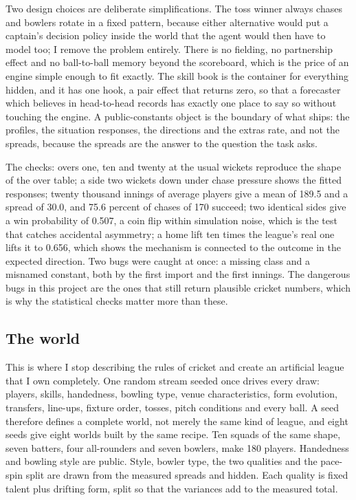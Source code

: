 \documentclass[11pt,letterpaper]{article}
\begin{document}
Two design choices are deliberate simplifications. The toss winner always chases and bowlers rotate in a fixed pattern, because either alternative would put a captain's decision policy inside the world that the agent would then have to model too; I remove the problem entirely. There is no fielding, no partnership effect and no ball-to-ball memory beyond the scoreboard, which is the price of an engine simple enough to fit exactly. The skill book is the container for everything hidden, and it has one hook, a pair effect that returns zero, so that a forecaster which believes in head-to-head records has exactly one place to say so without touching the engine. A public-constants object is the boundary of what ships: the profiles, the situation responses, the directions and the extras rate, and not the spreads, because the spreads are the answer to the question the task asks.


The checks: overs one, ten and twenty at the usual wickets reproduce the shape of the over table; a side two wickets down under chase pressure shows the fitted responses; twenty thousand innings of average players give a mean of 189.5 and a spread of 30.0, and 75.6 percent of chases of 170 succeed; two identical sides give a win probability of 0.507, a coin flip within simulation noise, which is the test that catches accidental asymmetry; a home lift ten times the league's real one lifts it to 0.656, which shows the mechanism is connected to the outcome in the expected direction. Two bugs were caught at once: a missing class and a misnamed constant, both by the first import and the first innings. The dangerous bugs in this project are the ones that still return plausible cricket numbers, which is why the statistical checks matter more than these.


\subsection{The world}

This is where I stop describing the rules of cricket and create an artificial league that I own completely. One random stream seeded once drives every draw: players, skills, handedness, bowling type, venue characteristics, form evolution, transfers, line-ups, fixture order, tosses, pitch conditions and every ball. A seed therefore defines a complete world, not merely the same kind of league, and eight seeds give eight worlds built by the same recipe. Ten squads of the same shape, seven batters, four all-rounders and seven bowlers, make 180 players. Handedness and bowling style are public. Style, bowler type, the two qualities and the pace-spin split are drawn from the measured spreads and hidden. Each quality is fixed talent plus drifting form, split so that the variances add to the measured total.
\end{document}
